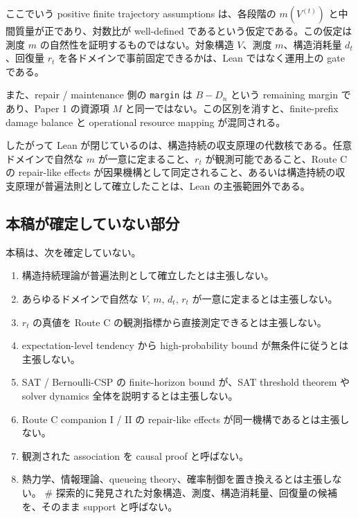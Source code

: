 \documentclass[12pt,a4paper]{article}
\begin{document}
ここでいう positive finite trajectory assumptions は、各段階の \(m(V^{(t)})\) と中間質量が正であり、対数比が well-defined であるという仮定である。この仮定は測度 \(m\) の自然性を証明するものではない。対象構造 \(V\)、測度 \(m\)、構造消耗量 \(d_{t}\)、回復量 \(r_{t}\) を各ドメインで事前固定できるかは、Lean ではなく運用上の gate である。

また、repair / maintenance 側の \texttt{margin} は \(B-D_{n}\) という remaining margin であり、Paper 1 の資源項 \(M\) と同一ではない。この区別を消すと、finite-prefix damage balance と operational resource mapping が混同される。

したがって Lean が閉じているのは、構造持続の収支原理の代数核である。任意ドメインで自然な \(m\) が一意に定まること、\(r_{t}\) が観測可能であること、Route C の repair-like effects が因果機構として同定されること、あるいは構造持続の収支原理が普遍法則として確立したことは、Lean の主張範囲外である。

\subsection{本稿が確定していない部分}\label{ux672cux7a3fux304cux78baux5b9aux3057ux3066ux3044ux306aux3044ux90e8ux5206}

本稿は、次を確定していない。

\begin{enumerate}
\def\labelenumi{\arabic{enumi}.}
\tightlist
\item
  構造持続理論が普遍法則として確立したとは主張しない。
\item
  あらゆるドメインで自然な \(V\), \(m\), \(d_{t}\), \(r_{t}\) が一意に定まるとは主張しない。
\item
  \(r_{t}\) の真値を Route C の観測指標から直接測定できるとは主張しない。
\item
  expectation-level tendency から high-probability bound が無条件に従うとは主張しない。
\item
  SAT / Bernoulli-CSP の finite-horizon bound が、SAT threshold theorem や solver dynamics 全体を説明するとは主張しない。
\item
  Route C companion I / II の repair-like effects が同一機構であるとは主張しない。
\item
  観測された association を causal proof と呼ばない。
\item
  熱力学、情報理論、queueing theory、確率制御を置き換えるとは主張しない。 \# 探索的に発見された対象構造、測度、構造消耗量、回復量の候補を、そのまま support と呼ばない。
\end{enumerate}
\end{document}
